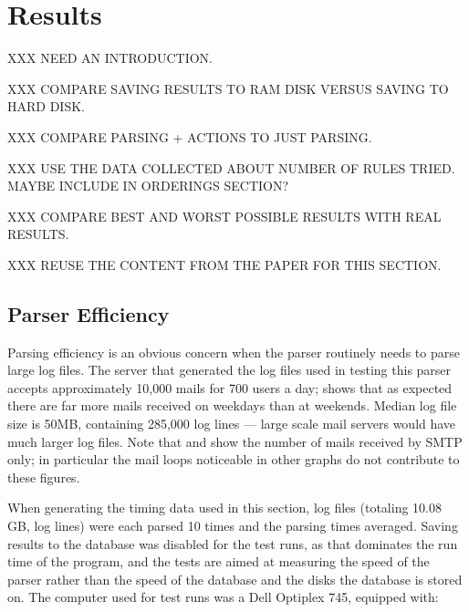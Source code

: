 \chapter{Results}

XXX NEED AN INTRODUCTION\@.

XXX COMPARE SAVING RESULTS TO RAM DISK VERSUS SAVING TO HARD DISK\@.

XXX COMPARE PARSING + ACTIONS TO JUST PARSING\@.

XXX USE THE DATA COLLECTED ABOUT NUMBER OF RULES TRIED\@.  MAYBE INCLUDE IN
ORDERINGS SECTION\@?

XXX COMPARE BEST AND WORST POSSIBLE RESULTS WITH REAL RESULTS\@.

XXX REUSE THE CONTENT FROM THE PAPER FOR THIS SECTION\@.

\section{Parser Efficiency}

\label{parser efficiency}

Parsing efficiency is an obvious concern when the parser routinely needs to
parse large log files.  The server that generated the log files used in
testing this parser accepts approximately 10,000 mails for 700 users a day;
 shows that as expected there are far more
mails received on weekdays than at weekends.   Median log file size is
50MB, containing 285,000 log lines --- large scale mail servers would have
much larger log files.  Note that  and
 show the number of
mails received by \gls{SMTP} only; in particular the mail loops noticeable
in other graphs do not contribute to these figures.



When generating the timing data used in this section, \numberOFlogFILES{}
log files (totaling 10.08 GB, \numberOFlogLINEShuman{} log lines) were each
parsed 10 times and the parsing times averaged.  Saving results to the
database was disabled for the test runs, as that dominates the run time of
the program, and the tests are aimed at measuring the speed of the parser
rather than the speed of the database and the disks the database is stored
on.  The computer used for test runs was a Dell Optiplex 745, equipped
with: 

